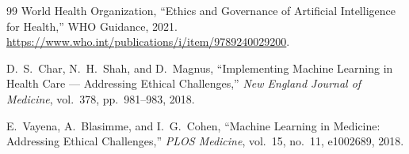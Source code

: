 \documentclass[12pt,a4paper]{article}
\begin{document}
\begin{thebibliography}{99}
World Health Organization,
``Ethics and Governance of Artificial Intelligence for Health,''
WHO Guidance, 2021.
\url{https://www.who.int/publications/i/item/9789240029200}.

D.~S.~Char, N.~H.~Shah, and D.~Magnus,
``Implementing Machine Learning in Health Care --- Addressing
Ethical Challenges,''
\emph{New England Journal of Medicine}, vol.~378, pp.~981--983,
2018.

E.~Vayena, A.~Blasimme, and I.~G.~Cohen,
``Machine Learning in Medicine: Addressing Ethical Challenges,''
\emph{PLOS Medicine}, vol.~15, no.~11, e1002689, 2018.

\end{thebibliography}
\end{document}
